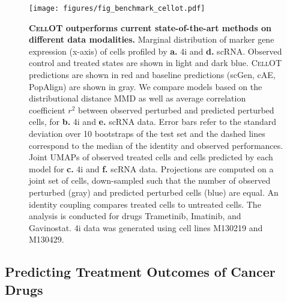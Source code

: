 \begin{figure}
    \centering
    \texttt{[image: figures/fig\_benchmark\_cellot.pdf]}
    \caption{ \textbf{\textsc{CellOT} outperforms current state-of-the-art methods on different data modalities.}  Marginal distribution of marker gene expression (x-axis) of cells profiled by \textbf{a.} 4i and \textbf{d.} scRNA. Observed control and treated states are shown in light and dark blue. \textsc{CellOT} predictions are shown in red and baseline predictions (scGen, cAE, PopAlign) are shown in gray. We compare models based on the distributional distance \acrshort{MMD} as well as average correlation coefficient $r^2$ between observed perturbed and predicted perturbed cells, for \textbf{b.} 4i and \textbf{e.} scRNA data. Error bars refer to the standard deviation over 10 bootstraps of the test set and the dashed lines correspond to the median of the identity and observed performances. Joint UMAPs of observed treated cells and cells predicted by each model for \textbf{c.} 4i and \textbf{f.} scRNA data. Projections are computed on a joint set of cells, down-sampled such that the number of observed perturbed (gray) and predicted perturbed cells (blue) are equal. An identity coupling compares treated cells to untreated cells. The analysis is conducted for drugs Trametinib, Imatinib, and Gavinostat. 4i data was generated using cell lines M130219 and M130429.}
    \label{fig:benchmark_cellot}
\end{figure}

\subsection{Predicting Treatment Outcomes of Cancer Drugs}


